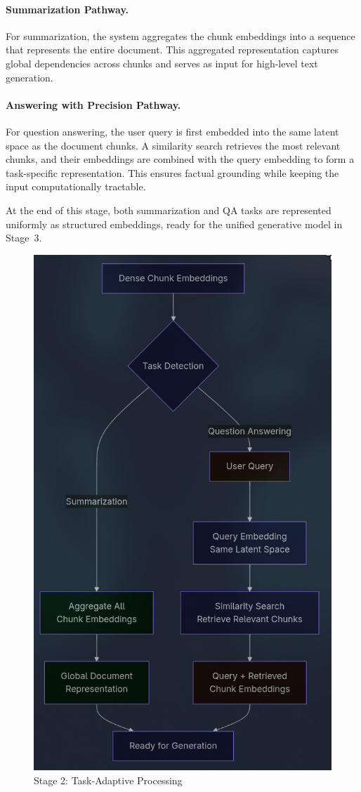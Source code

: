 \documentclass[11pt]{article}
\begin{document}
\paragraph{Summarization Pathway.} For summarization, the system aggregates the chunk embeddings into a sequence that represents the entire document. This aggregated representation captures global dependencies across chunks and serves as input for high-level text generation.

\paragraph{Answering with Precision Pathway.} For question answering, the user query is first embedded into the same latent space as the document chunks. A similarity search retrieves the most relevant chunks, and their embeddings are combined with the query embedding to form a task-specific representation. This ensures factual grounding while keeping the input computationally tractable.

At the end of this stage, both summarization and QA tasks are represented uniformly as structured embeddings, ready for the unified generative model in Stage~3.

\begin{figure}[H]
    \centering
    \includegraphics[width=0.6\columnwidth]{assets/Stage_2.jpeg}
    \caption*{Stage 2: Task-Adaptive Processing}
    \label{fig:stage2}
\end{figure}
\end{document}
